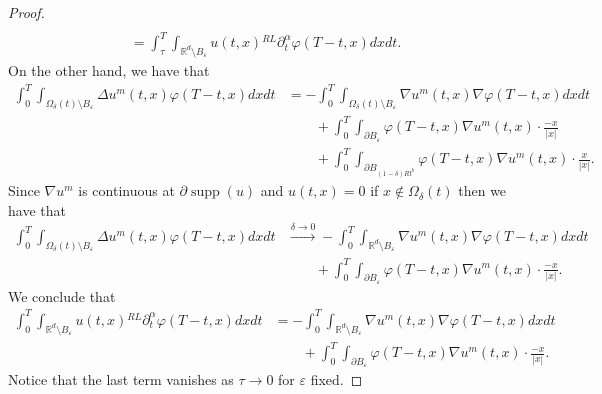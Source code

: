 \documentclass[a4paper]{article}
\theoremstyle{definition}
\newcommand{\Rd}{{\mathbb{R}^d}}
\newcommand{\dRL}{{^{RL}\partial_t^\alpha}}
\begin{document}
\begin{proof}
\begin{align*}
    \\
    & =
    \int_{\tau}^T \int_{\Rd \setminus B_\varepsilon} u(t,x) \dRL  \varphi (T-t,x)dxdt.
  \end{align*}
  On the other hand, we have that
  \begin{align*}
    \int_0^{T} \int_{\Omega_\delta(t) \setminus B_\varepsilon} \Delta u^{m} (t,x) \varphi (T- t,x) dxdt
    & = - \int_0^{T} \int_{\Omega_\delta(t) \setminus B_\varepsilon} \nabla u^{m} (t,x) \nabla \varphi (T- t,x) dxdt
    \\
    & \qquad + \int_0^T \int_{\partial B_\varepsilon} \varphi(T-t,x) \nabla u^{m}(t,x) \cdot {\frac{-x}{|x|}}
    \\
    & \qquad + \int_0^T \int_{\partial B_{(1-\delta)Rt^b}} \varphi(T-t,x) \nabla u^{m}(t,x) \cdot {\frac{x}{|x|}}.
  \end{align*}
  Since $\nabla u^{m}$ is continuous at $\partial \operatorname{supp}(u)$ and $u(t,x) = 0$ if $x \notin \Omega_\delta(t)$ then we have that
  \begin{align*}
    \int_0^{T} \int_{\Omega_\delta(t) \setminus B_\varepsilon} \Delta u^{m} (t,x) \varphi (T- t,x) dxdt
    & \overset{\delta \to 0} \longrightarrow
    - \int_0^{T} \int_{\mathbb R^d \setminus B_\varepsilon} \nabla u^{m} (t,x) \nabla \varphi (T- t,x) dxdt
    \\
    & \qquad + \int_0^T \int_{\partial B_\varepsilon} \varphi(T-t,x) \nabla u^{m}(t,x) \cdot {\frac{-x}{|x|}}.
  \end{align*}
  We conclude that
  \begin{equation}
    \label{eq:weak formulation 1}
    \begin{aligned}
      \int_{0}^T \int_{\Rd \setminus B_\varepsilon} u(t,x) \dRL \varphi (T-t,x)dxdt
      & =
      - \int_0^{T} \int_{\mathbb R^d \setminus B_\varepsilon} \nabla u^{m} (t,x) \nabla \varphi (T- t,x) dxdt
      \\
      & \qquad
      + \int_0^T \int_{\partial B_\varepsilon} \varphi(T-t,x) \nabla u^{m}(t,x) \cdot {\frac{-x}{|x|}}.
    \end{aligned}
  \end{equation}
  Notice that the last term vanishes as $\tau \to 0$ for $\varepsilon$ fixed.


\end{proof}
\end{document}
